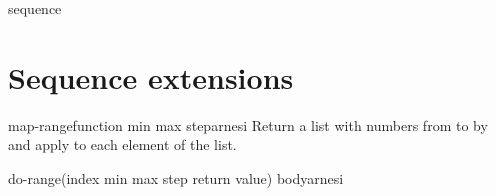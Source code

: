 \begin{class}{sequence}{}{}{}
  
\end{class}

\section{Sequence extensions}
\label{sec:sequence-extensions}

\begin{function}{map-range}{function min max \op step}{arnesi}{}
  Return a list with numbers from  to  by 
  and apply  to each element of the list.
\end{function}

\begin{macro}{do-range}{(index \op min max step return value) \body body}{arnesi}{}
  
\end{macro}
